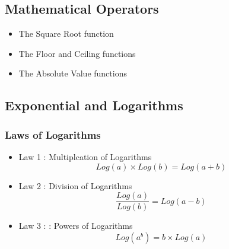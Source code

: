\documentclass[12pt]{article}
\begin{document}
\subsection{Mathematical Operators}
\begin{itemize}
\item The Square Root function
\item The Floor and Ceiling functions
\item The Absolute Value functions
\end{itemize}

\subsection{Exponential and Logarithms}
\subsubsection*{Laws of Logarithms}

\begin{itemize}
\item Law 1 : Multiplcation of Logarithms
\[ Log(a) \times Log(b) = Log(a+b) \]
\item Law 2 : Division of Logarithms
\[ \frac{Log(a)}{Log(b)} = Log(a-b) \]
\item Law 3 : : Powers of Logarithms
\[ Log(a^b) = b \times Log(a) \]
\end{itemize}
\end{document}
